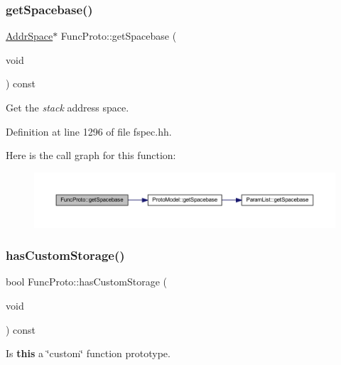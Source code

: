 \subsubsection{\texorpdfstring{getSpacebase()}{getSpacebase()}}
{\footnotesize\ttfamily \mbox{\hyperlink{class_addr_space}{Addr\+Space}}$\ast$ Func\+Proto\+::get\+Spacebase (\begin{DoxyParamCaption}\item[{void}]{ }\end{DoxyParamCaption}) const\hspace{0.3cm}{\ttfamily [inline]}}



Get the {\itshape stack} address space. 



Definition at line 1296 of file fspec.\+hh.

Here is the call graph for this function\+:
\nopagebreak
\begin{figure}[H]
\begin{center}
\leavevmode
\includegraphics[width=350pt]{class_func_proto_a41cf46f20373d37b4a7cf22201112abb_cgraph}
\end{center}
\end{figure}
\mbox{\label{class_func_proto_a662b2cce15487591fabd9632a335986c}} 
\subsubsection{\texorpdfstring{hasCustomStorage()}{hasCustomStorage()}}
{\footnotesize\ttfamily bool Func\+Proto\+::has\+Custom\+Storage (\begin{DoxyParamCaption}\item[{void}]{ }\end{DoxyParamCaption}) const\hspace{0.3cm}{\ttfamily [inline]}}



Is {\bfseries{this}} a \char`\"{}custom\char`\"{} function prototype. 



